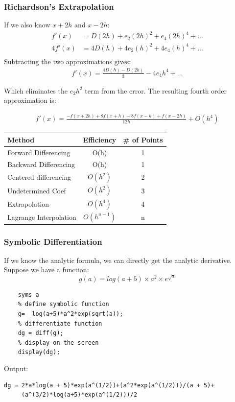 \documentclass{beamer}
\begin{document}

\begin{frame}
\frametitle{Richardson’s Extrapolation}

If we also know $x+2h$ and $x-2h$:\\
\begin{align*}
f'(x) &= D(2h) + e_2(2h)^2 + e_4(2h)^4 + \ldots\\
4f'(x) &= 4D(h) + 4e_2(h)^2 + 4e_4(h)^4 + \ldots\\
\end{align*}
Subtracting the two approximations gives:
\begin{align*}
f'(x) = \frac{4D(h) - D(2h)}{3} - 4e_4h^4 + \ldots
\end{align*}

Which eliminates the $e_2h^2$ term from the error.  The resulting fourth order approximation is:

\begin{align*}
f'(x) = \frac{−f(x + 2h) + 8f(x + h) − 8f(x − h) + f(x − 2h)}{12h} + O(h^4)
\end{align*}

\end{frame}

\begin{frame}
\centering
{}
\begin{tabular}{ l| c | c}
	\textbf{Method} & \textbf{Efficiency} & \textbf{\# of Points}\\ \hline
	Forward Differencing & O(h) & 1\\
	Backward Differencing & O(h)  & 1\\
	Centered differencing & $O(h^2)$ & 2\\
	Undetermined Coef & $O(h^2)$ & 3\\
	Extrapolation & $O(h^4)$ &4\\
	Lagrange Interpolation & $O(h^{n-1})$ & n
\end{tabular}
\end{frame}

\begin{frame}[fragile]
	\frametitle{Symbolic Differentiation}
If we know the analytic formula, we can directly get the analytic derivative.
Suppose we have a function:
	\begin{equation*}
	g(a) = log(a+5) \times a^2 \times e^{\sqrt{a}}
	\end{equation*}
	\begin{lstlisting}[tabsize=8,basicstyle=\footnotesize]
	% define symbolic variables
	syms a
	% define symbolic function
	g=  log(a+5)*a^2*exp(sqrt(a));
	% differentiate function
	dg = diff(g);
	% display on the screen
	display(dg);
	\end{lstlisting}

	Output:
	\begin{Verbatim}[fontsize=\small]
dg = 2*a*log(a + 5)*exp(a^(1/2))+(a^2*exp(a^(1/2)))/(a + 5)+
     (a^(3/2)*log(a+5)*exp(a^(1/2)))/2
	\end{Verbatim}
%	
\end{frame}
\end{document}
